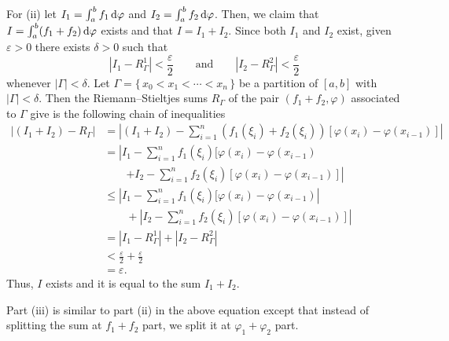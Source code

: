 \begin{solution}
  For (ii) let $I_1=\int_a^b f_1\mathop{}\!\mathrm{d}\varphi$ and $I_2=\int_a^b
  f_2\mathop{}\!\mathrm{d}\varphi$. Then, we claim that $I=\int_a^b (f_1+f_2)\mathop{}\!\mathrm{d}\varphi$
  exists and that $I=I_1+I_2$. Since both $I_1$ and $I_2$ exist, given
  $\varepsilon>0$ there exists $\delta>0$ such that
  \[
    |I_1-R_\Gamma^1|<\frac{\varepsilon}{2}\qquad\text{and}\qquad
    |I_2-R_\Gamma^2|<\frac{\varepsilon}{2}
  \]
  whenever $|\Gamma|<\delta$. Let $\Gamma=\{\,x_0<x_1<\cdots<x_n\,\}$ be a
  partition of $[a,b]$ with $|\Gamma|<\delta$. Then the Riemann--Stieltjes
  sums $R_\Gamma$ of the pair $(f_1+f_2,\varphi)$ associated to $\Gamma$
  give is the following chain of inequalities
  \begin{align*}
    |(I_1+I_2)-R_{\Gamma}|
    &=\left|(I_1+I_2)
      -\sum_{i=1}^n (f_1(\xi_i)+f_2(\xi_i))[\varphi(x_i)-\varphi(x_{i-1})]
      \right|\\
    &=\left|
      I_1
      -\sum_{i=1}^n
      f_1(\xi_i)[\varphi(x_i)-\varphi(x_{i-1})\right.\\
    &\qquad
      \left.+I_2
      -\sum_{i=1}^n f_2(\xi_i)[\varphi(x_i)-\varphi(x_{i-1})]\right|\\
    &\leq
      \left|
      I_1
      -\sum_{i=1}^n
      f_1(\xi_i)[\varphi(x_i)-\varphi(x_{i-1})
      \right|\\
    &\qquad
      +\left|
      I_2-\sum_{i=1}^n f_2(\xi_i)[\varphi(x_i)-\varphi(x_{i-1})]\right|\\
    &=|I_1-R_\Gamma^1|+|I_2-R_\Gamma^2|\\
    &<\frac{\varepsilon}{2}+\frac{\varepsilon}{2}\\
    &=\varepsilon.
  \end{align*}
  Thus, $I$ exists and it is equal to the sum $I_1+I_2$.

  Part (iii) is similar to part (ii) in the above equation except that
  instead of splitting the sum at $f_1+f_2$ part, we split it at
  $\varphi_1+\varphi_2$ part.
\end{solution}

